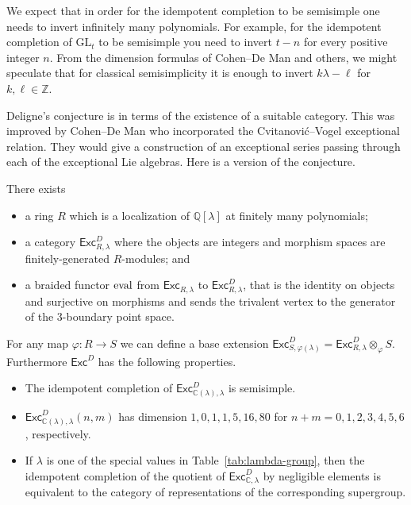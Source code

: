 \documentclass[12pt]{amsart}
\begin{document}
We expect that in order for the idempotent completion to be semisimple one
needs to invert infinitely many polynomials.  For example, for the idempotent
completion of $\mathrm{GL}_t$ to be semisimple you need to invert $t-n$ for
every positive integer $n$.  From the dimension formulas of Cohen--De Man and
others, we might speculate that for classical semisimplicity it is
enough to invert $k\lambda-\ell$ for $k, \ell \in \mathbb{Z}$.

Deligne's conjecture \cite{MR1378507} is in terms of the existence of
a suitable category. This was
improved by Cohen--De Man \cite{MR1714606} who incorporated the
Cvitanović--Vogel exceptional
relation. They would give a construction of an exceptional series passing
through each of the exceptional Lie algebras.
Here is a version of the conjecture.

\begin{conjecture}\label{conj:Deligne}
There exists
  \begin{itemize}
  \item a ring $R$ which is a localization of $\mathbb{Q}[\lambda]$ at finitely many polynomials;
  \item a category
    $\mathsf{Exc}^D_{R,\lambda}$ where the objects are
    integers and morphism spaces are finitely-generated $R$-modules; and
  \item a braided functor $\operatorname{eval}$ from $\mathsf{Exc}_{R,\lambda}$ to $\mathsf{Exc}^D_{R,\lambda}$, that is the identity on objects and surjective on morphisms and sends the trivalent vertex to the generator of the $3$-boundary point space.
  \end{itemize}
For any map $\varphi\colon R \rightarrow S$ we can define a base
extension $\mathsf{Exc}^D_{S,\varphi(\lambda)} =
\mathsf{Exc}^D_{R,\lambda} \otimes_\varphi S$.  Furthermore $\mathsf{Exc}^D$ has the following properties.
\begin{itemize}
\item The idempotent completion of $\mathsf{Exc}^D_{\mathbb{C}(\lambda),\lambda}$ is semisimple.
\item $\mathsf{Exc}^D_{\mathbb{C}(\lambda),\lambda}(n,m)$ has dimension $1,\allowbreak0,\allowbreak1,\allowbreak1,\allowbreak5,\allowbreak16,\allowbreak80$
for $n+m=0,1,2,3,4,5,6$, respectively.
\item If $\lambda$ is one of the special values in
  Table~\ref{tab:lambda-group}, then the idempotent completion of the
  quotient of
  $\mathsf{Exc}^D_{\mathbb{C},\lambda}$ by negligible elements is
  equivalent to the category of representations of the corresponding
  supergroup.
\end{itemize}
\end{conjecture}
\end{document}
